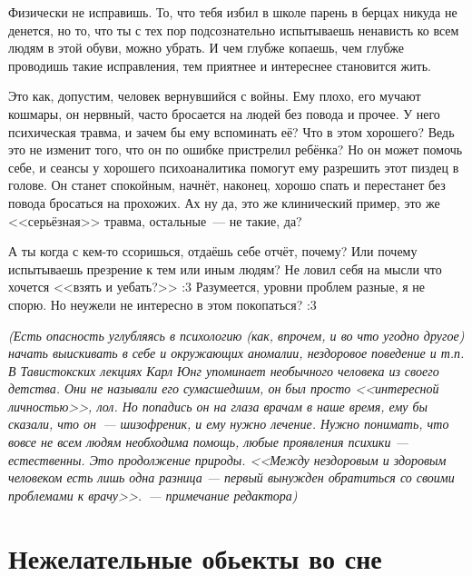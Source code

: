 \documentclass[a5paper,12pt,twoside]{memoir}
\begin{document}
Физически не исправишь. То, что тебя избил в школе парень в берцах никуда не денется, но то, что ты с тех пор подсознательно испытываешь ненависть ко всем людям в этой обуви, можно убрать. И чем глубже копаешь, чем глубже проводишь такие исправления, тем приятнее и интереснее становится жить.

Это как, допустим, человек вернувшийся с войны. Ему плохо, его мучают кошмары, он нервный, часто бросается на людей без повода и прочее. У него психическая травма, и зачем бы ему вспоминать её? Что в этом хорошего? Ведь это не изменит того, что он по ошибке пристрелил ребёнка? Но он может помочь себе, и сеансы у хорошего психоаналитика помогут ему разрешить этот пиздец в голове. Он станет спокойным, начнёт, наконец, хорошо спать и перестанет без повода бросаться на прохожих. Ах ну да, это же клинический пример, это же <<серьёзная>> травма, остальные~--- не такие, да? 

А ты когда с кем-то ссоришься, отдаёшь себе отчёт, почему? Или почему испытываешь презрение к тем или иным людям? Не ловил себя на мысли что хочется <<взять и уебать?>> :3 
Разумеется, уровни проблем разные, я не спорю. Но неужели не интересно в этом покопаться? :3

\textit{(Есть опасность углубляясь в психологию (как, впрочем, и во что угодно другое) начать выискивать в себе и окружающих аномалии, нездоровое поведение и т.п. В Тавистокских лекциях Карл Юнг упоминает необычного человека из своего детства. Они не называли его сумасшедшим, он был просто <<интересной личностью>>, лол. Но попадись он на глаза врачам в наше время, ему бы сказали, что он~--- шизофреник, и ему нужно лечение. Нужно понимать, что вовсе не всем людям необходима помощь, любые проявления психики — естественны. Это продолжение природы. <<Между нездоровым и здоровым человеком есть лишь одна разница — первый вынужден обратиться со своими проблемами к врачу>>.~--- примечание редактора)}




\section{Нежелательные обьекты во сне}

\end{document}
